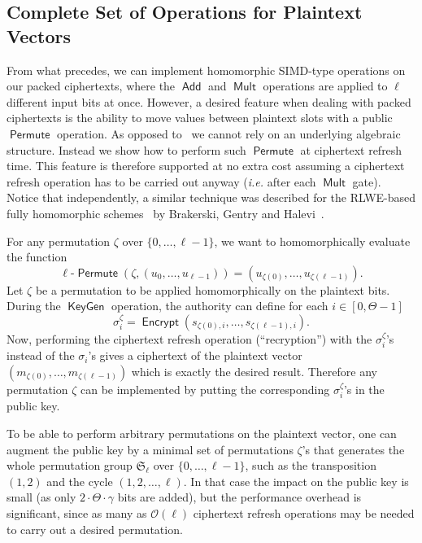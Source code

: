 \documentclass{llncs}
\newcommand{\ie}{\textsl{i.e.}\xspace}
\DeclareMathOperator{\KeyGen}{\ensuremath{\mathsf{KeyGen}}}
\DeclareMathOperator{\Encrypt}{\ensuremath{\mathsf{Encrypt}}}
\DeclareMathOperator{\Add}{\ensuremath{\mathsf{Add}}}
\DeclareMathOperator{\Mult}{\ensuremath{\mathsf{Mult}}}
\DeclareMathOperator{\Permute}{\ensuremath{\mathsf{Permute}}}
\renewcommand*\O{\ensuremath{\mathcal O}}
\begin{document}
\subsection{Complete Set of Operations for Plaintext Vectors}\label{subsec:permutations}

From what precedes, we can implement homomorphic SIMD-type operations on
our packed ciphertexts, where the $\Add$ and $\Mult$ operations are
applied to $\ell$ different input bits at once. However, a desired
feature when dealing with packed ciphertexts is the ability to move
values between plaintext slots with a public $\Permute$ operation. As opposed to~\cite{GHS2012a} we cannot rely on an underlying algebraic structure.
Instead we show how to perform  such $\Permute$ at ciphertext refresh time.
This feature is therefore supported at no extra cost assuming a
ciphertext refresh operation has to be carried out anyway (\ie after each
$\Mult$ gate). Notice that independently, a similar technique was described 
for the RLWE-based fully homomorphic schemes~\cite{BV2011a,BV2011b,GHS2012a}
by Brakerski, Gentry and Halevi~\cite{BGH2013}.

\smallskip
For any permutation $\zeta$ over $\{0,\ldots,{\ell-1}\}$, we want to homomorphically evaluate the function
\[ \text{$\ell$-$\Permute$}\left(\zeta,\left(u_0,\ldots,u_{\ell-1}\right)\right) = \left(u_{\zeta(0)},\ldots,u_{\zeta({\ell-1})}\right). \]
Let $\zeta$ be a permutation to be applied  homomorphically on the plaintext bits. During the $\KeyGen$ operation, the authority can define for each $i\in[0,\Theta-1]$
\[ \sigma_{i}^{\zeta} = \Encrypt(s_{\zeta(0),i},\ldots,s_{\zeta(\ell-1),i}). \]
Now, performing the ciphertext refresh operation (``recryption'') with the $\sigma_i^\zeta$'s instead of the $\sigma_i$'s gives a ciphertext of the plaintext vector
$(m_{\zeta(0)},\ldots,m_{\zeta(\ell-1)})$
which is exactly the desired result. Therefore any permutation $\zeta$
can be implemented by putting the corresponding $\sigma^\zeta_i$'s in the public key.

To be able to perform arbitrary permutations on the plaintext vector, one
can augment the public key by a minimal set of permutations $\zeta$'s
that generates the whole permutation group $\mathfrak S_\ell$ over $\{0,\ldots,\ell-1\}$, such as
the transposition $(1,2)$ and the cycle $(1,2,\ldots,\ell)$. In that case
the impact on the public key is small (as only $2\cdot \Theta\cdot
\gamma$ bits are added), but the performance overhead is significant,
since as many as $\O(\ell)$ ciphertext refresh operations may be needed to
carry out a desired permutation.
\end{document}
